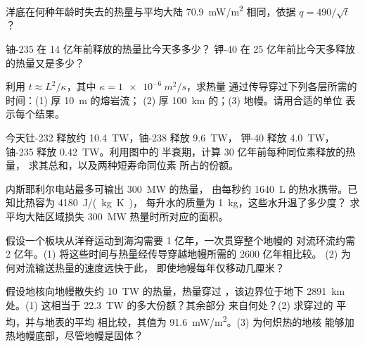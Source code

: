 \begin{exercise}[$\star\star$]\label{exo:g12:internal-heat:9}
洋底在何种年龄时失去的热量与平均大陆
\qty{70.9}{mW/m^2} 相同，依据 $q = 490/\sqrt{t}$？
\end{exercise}

\begin{exercise}[$\star\star$]\label{exo:g12:internal-heat:10}
铀-235 在 14 亿年前释放的热量比今天多多少？
钾-40 在 25 亿年前比今天多释放的热量又是多少？
\end{exercise}

\begin{exercise}[$\star\star$]\label{exo:g12:internal-heat:11}
利用 $t \approx L^2/\kappa$，其中 $\kappa = \qty{1e-6}{m^2/s}$，求热量
通过传导穿过下列各层所需的时间：(1) 厚 \qty{10}{m} 的熔岩流；
(2) 厚 \qty{100}{km} 的；(3) 地幔。请用合适的单位
表示每个结果。
\end{exercise}

\begin{exercise}[$\star\star\star$]\label{exo:g12:internal-heat:12}
今天钍-232 释放约 \qty{10.4}{TW}，铀-238 释放 \qty{9.6}{TW}，
钾-40 释放 \qty{4.0}{TW}，铀-235 释放 \qty{0.42}{TW}。利用图中的
半衰期，计算 30 亿年前每种同位素释放的热量，
求其总和，以及两种短寿命同位素
所占的份额。
\end{exercise}

\begin{exercise}[$\star\star\star$]\label{exo:g12:internal-heat:13}
内斯耶利尔电站最多可输出 \qty{300}{MW} 的热量，
由每秒约 \qty{1640}{L} 的热水携带。已知比热容为 \qty{4180}{J/(kg.K)}，
每升水的质量为 \qty{1}{kg}，这些水升温了多少度？
求平均大陆区域损失
\qty{300}{MW} 热量时所对应的面积。
\end{exercise}

\begin{exercise}[$\star\star\star$]\label{exo:g12:internal-heat:14}
假设一个板块从洋脊运动到海沟需要 1 亿年，一次贯穿整个地幔的
对流环流约需 2 亿年。(1) 将这些时间与热量经传导穿越地幔所需的
2600 亿年相比较。
(2) 为何对流输送热量的速度远快于此，
即使地幔每年仅移动几厘米？
\end{exercise}

\begin{exercise}[$\star\star\star$]\label{exo:g12:internal-heat:15}
假设地核向地幔散失约 \qty{10}{TW} 的热量，热量穿过
，该边界位于地下 \qty{2891}{km} 处。(1) 这相当于
 \qty{22.3}{TW} 的多大份额？其余部分
来自何处？(2) 求穿过的
平均，并与地表的平均
相比较，其值为 \qty{91.6}{mW/m^2}。(3) 为何炽热的地核
能够加热地幔底部，尽管地幔是固体？
\end{exercise}

